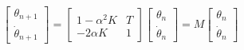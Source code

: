 \begin{align}
\label{eq:PoincareMap}
\begin{bmatrix}
\theta_{n+1}  \\
\dot \theta_{n+1}
\end{bmatrix} = \begin{bmatrix}
1-\alpha^2 K & T \\
-2\alpha K & 1
\end{bmatrix}\begin{bmatrix}
 \theta_n  \\
\dot \theta_n 
\end{bmatrix} = M
\begin{bmatrix}
 \theta_n  \\
\dot \theta_n 
\end{bmatrix}
\end{align}



